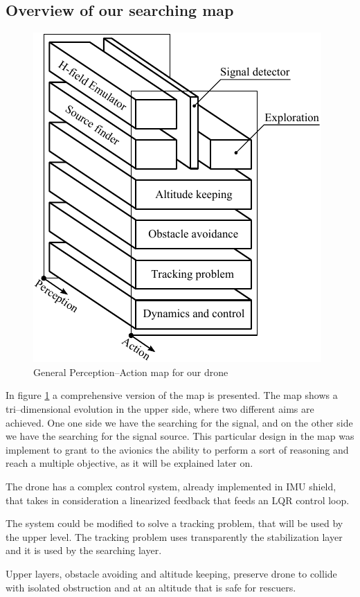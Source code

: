 \subsection{Overview of our searching map}
\begin{figure}[h]
	\centering
	\includegraphics[scale=0.9]{ch3/img/PA_map_general.pdf}
	\caption{General Perception--Action map for our drone}
	\label{fig:genPAmap}
\end{figure}
In figure \ref{fig:genPAmap} a comprehensive version of the map is presented. The map shows a tri--dimensional evolution in the upper side, where two different aims are achieved. One one side we have the searching for the signal, and on the other side we have the searching for the signal source. This particular design in the map was implement to grant to the avionics the ability to perform a sort of reasoning and reach a multiple objective, as it will be explained later on.

The drone has a complex control system, already implemented in IMU shield, that takes in consideration a linearized feedback that feeds an LQR control loop. 

The system could be modified to solve a tracking problem, that will be used by the upper level. The tracking problem uses transparently the stabilization layer and it is used by the searching layer.

Upper layers, obstacle avoiding and altitude keeping, preserve drone to collide with isolated obstruction and at an altitude that is safe for rescuers. 
\FloatBarrier